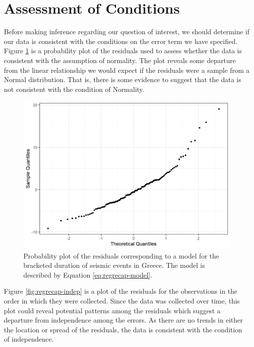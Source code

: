 \documentclass[
]{book}
\theoremstyle{plain}
\theoremstyle{mydefn}
\theoremstyle{myexmpl}
\theoremstyle{remark}
\begin{document}
\hypertarget{assessment-of-conditions}{%
\section{Assessment of Conditions}\label{assessment-of-conditions}}

Before making inference regarding our question of interest, we should determine if our data is consistent with the conditions on the error term we have specified. Figure \ref{fig:regrecap-normality} is a probability plot of the residuals used to assess whether the data is consistent with the assumption of normality. The plot reveals some departure from the linear relationship we would expect if the residuals were a sample from a Normal distribution. That is, there is some evidence to suggest that the data is not consistent with the condition of Normality.



\begin{figure}

{\centering \includegraphics[width=0.8\linewidth]{./Images/regrecap-normality-1} 

}

\caption{Probability plot of the residuals corresponding to a model for the bracketed duration of seismic events in Greece. The model is described by Equation \eqref{eq:regrecap-model}.}\label{fig:regrecap-normality}
\end{figure}

Figure \ref{fig:regrecap-indep} is a plot of the residuals for the observations in the order in which they were collected. Since the data was collected over time, this plot could reveal potential patterns among the residuals which suggest a departure from independence among the errors. As there are no trends in either the location or spread of the residuals, the data is consistent with the condition of independence.
\end{document}
